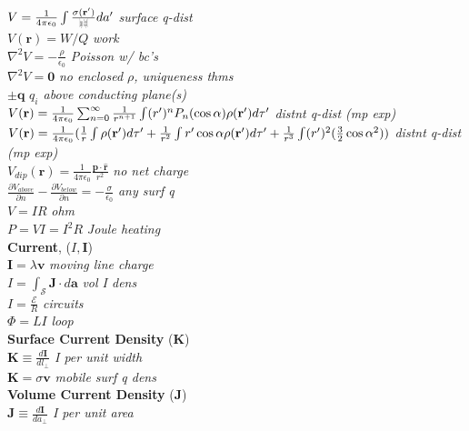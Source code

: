 \documentclass[9pt]{extarticle}
\def\rcurs{{\mbox{$\resizebox{.09in}{.08in}{\texttt{[image: ScriptR]}}$}}}
\begin{document}
\begin{multicols}{3}
$V = \frac{1}{4\pi\epsilon_{0}}\int\frac{\sigma(\mathbf{r'})}{\rcurs}da'$ \textit{surface q-dist} \\
$V(\mathbf{r}) = W/Q$ \textit{work} \\
$\nabla^{2}V = -\frac{\rho}{\epsilon_{0}}$ \textit{Poisson w/ bc's} \\
$\nabla^{2}V = \mathbf{0}$ \textit{no enclosed $\rho$, uniqueness thms} \\
$\pm\mathbf{q}$  \textit{$q_{i}$ above conducting plane(s)} \\
$V(\mathbf{r}) = \frac{1}{4\pi\epsilon_{0}}\sum_{n=0}^{\infty}\frac{1}{r^{n+1}}\\\int(r')^{n}P_{n}(\cos{\alpha})\rho(\mathbf{r'})d\tau'$ \textit{distnt q-dist (mp exp)} \\
$V(\mathbf{r}) = \frac{1}{4\pi\epsilon_{0}} (\frac{1}{r}\int\rho(\mathbf{r'})d\tau' \\ + \frac{1}{r^{2}}\int r'\cos{\alpha}\rho(\mathbf{r'})d\tau' \\ + \frac{1}{r^{3}}\int(r')^{2}(\frac{3}{2}\cos{\alpha}^{2}))$  \textit{distnt q-dist (mp exp)} \\
$V_{dip}(\mathbf{r}) = \frac{1}{4\pi\epsilon_{0}}\frac{\mathbf{p}\cdot\mathbf{\hat{r}}}{r^{2}}$  \textit{no net charge} \\
$\frac{\partial V_{above}}{\partial n} - \frac{\partial V_{below}}{\partial n} = -\frac{\sigma}{\epsilon_{0}}$ \textit{any surf q} \\
$V=IR$ \textit{ohm} \\
$P = VI =  I^{2}R$ \textit{Joule heating} \\
\textbf{Current}, ($I, \mathbf{I}$) \\
$\mathbf{I} = \lambda\mathbf{v}$ \textit{moving line charge} \\
$I = \int_{\mathcal{S}} \mathbf{J}\cdot d\mathbf{a}$ \textit{vol I dens} \\
$I = \frac{\mathcal{E}}{R}$ \textit{circuits} \\
$\Phi = LI$ \textit{loop} \\
\textbf{Surface Current Density} ($\mathbf{K}$) \\
$\mathbf{K} \equiv \frac{d\mathbf{I}}{dl_{\perp}}$ \textit{I per unit width} \\
$\mathbf{K} = \sigma\mathbf{v}$ \textit{mobile surf q dens} \\
\textbf{Volume Current Density} ($\mathbf{J}$) \\
$\mathbf{J} \equiv \frac{d\mathbf{I}}{da_{\perp}}$ \textit{I per unit area} \\

\end{multicols}
\end{document}

